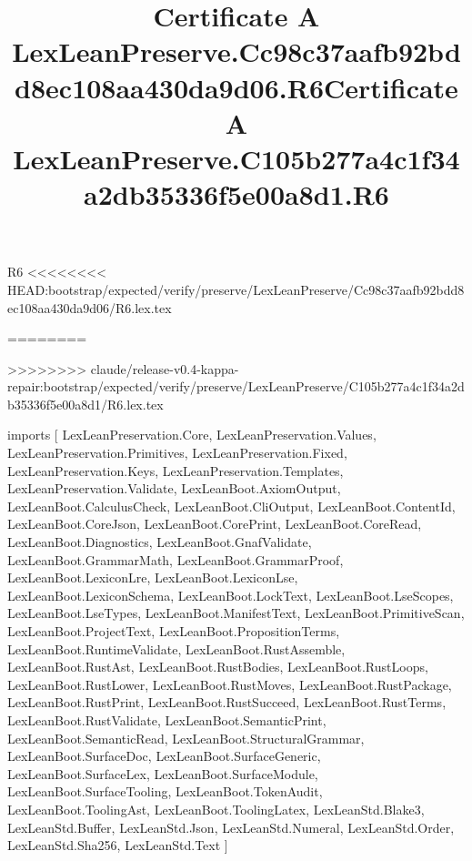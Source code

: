 \begin{lexlean}{R6}
<<<<<<<< HEAD:bootstrap/expected/verify/preserve/LexLeanPreserve/Cc98c37aafb92bdd8ec108aa430da9d06/R6.lex.tex
\title{Certificate A LexLeanPreserve.Cc98c37aafb92bdd8ec108aa430da9d06.R6}
========
\title{Certificate A LexLeanPreserve.C105b277a4c1f34a2db35336f5e00a8d1.R6}
>>>>>>>> claude/release-v0.4-kappa-repair:bootstrap/expected/verify/preserve/LexLeanPreserve/C105b277a4c1f34a2db35336f5e00a8d1/R6.lex.tex
\begin{coremodule}
imports [
  LexLeanPreservation.Core,
  LexLeanPreservation.Values,
  LexLeanPreservation.Primitives,
  LexLeanPreservation.Fixed,
  LexLeanPreservation.Keys,
  LexLeanPreservation.Templates,
  LexLeanPreservation.Validate,
  LexLeanBoot.AxiomOutput,
  LexLeanBoot.CalculusCheck,
  LexLeanBoot.CliOutput,
  LexLeanBoot.ContentId,
  LexLeanBoot.CoreJson,
  LexLeanBoot.CorePrint,
  LexLeanBoot.CoreRead,
  LexLeanBoot.Diagnostics,
  LexLeanBoot.GnafValidate,
  LexLeanBoot.GrammarMath,
  LexLeanBoot.GrammarProof,
  LexLeanBoot.LexiconLre,
  LexLeanBoot.LexiconLse,
  LexLeanBoot.LexiconSchema,
  LexLeanBoot.LockText,
  LexLeanBoot.LseScopes,
  LexLeanBoot.LseTypes,
  LexLeanBoot.ManifestText,
  LexLeanBoot.PrimitiveScan,
  LexLeanBoot.ProjectText,
  LexLeanBoot.PropositionTerms,
  LexLeanBoot.RuntimeValidate,
  LexLeanBoot.RustAssemble,
  LexLeanBoot.RustAst,
  LexLeanBoot.RustBodies,
  LexLeanBoot.RustLoops,
  LexLeanBoot.RustLower,
  LexLeanBoot.RustMoves,
  LexLeanBoot.RustPackage,
  LexLeanBoot.RustPrint,
  LexLeanBoot.RustSucceed,
  LexLeanBoot.RustTerms,
  LexLeanBoot.RustValidate,
  LexLeanBoot.SemanticPrint,
  LexLeanBoot.SemanticRead,
  LexLeanBoot.StructuralGrammar,
  LexLeanBoot.SurfaceDoc,
  LexLeanBoot.SurfaceGeneric,
  LexLeanBoot.SurfaceLex,
  LexLeanBoot.SurfaceModule,
  LexLeanBoot.SurfaceTooling,
  LexLeanBoot.TokenAudit,
  LexLeanBoot.ToolingAst,
  LexLeanBoot.ToolingLatex,
  LexLeanStd.Blake3,
  LexLeanStd.Buffer,
  LexLeanStd.Json,
  LexLeanStd.Numeral,
  LexLeanStd.Order,
  LexLeanStd.Sha256,
  LexLeanStd.Text
]


\end{coremodule}
\end{lexlean}
